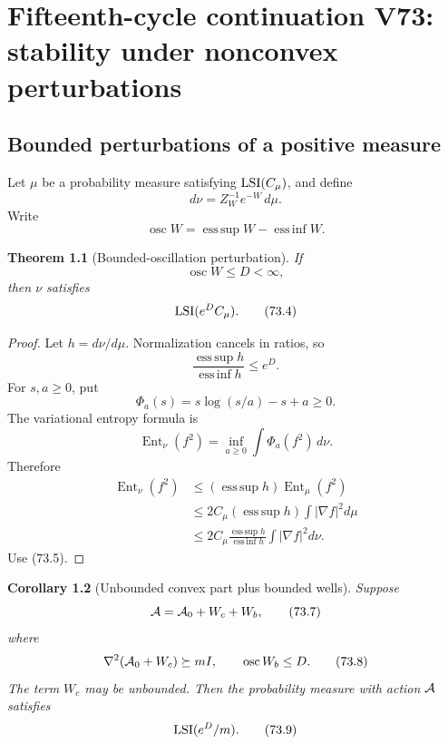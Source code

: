 \documentclass[11pt]{article}
\newtheorem{theorem}{Theorem}[section]
\newtheorem{corollary}[theorem]{Corollary}
\theoremstyle{remark}
\begin{document}
\chapter{Fifteenth-cycle continuation V73: stability under nonconvex perturbations}
\label{sec:v15v73}

\section{Bounded perturbations of a positive measure}

Let \(\mu\) be a probability measure satisfying
\({\rm LSI}(C_\mu)\), and define
\[
 d\nu=Z_W^{-1}e^{-W}\,d\mu.                           \tag{73.1}
\]
Write
\[
 \operatorname{osc}W=\operatorname*{ess\,sup}W
 -\operatorname*{ess\,inf}W.                         \tag{73.2}
\]

\begin{theorem}[Bounded-oscillation perturbation]
\label{thm:v15v73-holley}
If
\[
 \operatorname{osc}W\leq D<\infty,                    \tag{73.3}
\]
then \(\nu\) satisfies
\[
 {\rm LSI}(e^DC_\mu).                                 \tag{73.4}
\]
\end{theorem}

\begin{proof}
Let \(h=d\nu/d\mu\).  Normalization cancels in ratios, so
\[
 \frac{\operatorname*{ess\,sup}h}
 {\operatorname*{ess\,inf}h}\leq e^D.                 \tag{73.5}
\]
For \(s,a\geq0\), put
\[
 \Phi_a(s)=s\log(s/a)-s+a\geq0.
\]
The variational entropy formula is
\[
 \operatorname{Ent}_\nu(f^2)
 =
 \inf_{a\geq0}\int\Phi_a(f^2)\,d\nu.                  \tag{73.6}
\]
Therefore
\[
\begin{split}
 \operatorname{Ent}_\nu(f^2)
 &\leq
 (\operatorname*{ess\,sup}h)
 \operatorname{Ent}_\mu(f^2)\\
 &\leq
 2C_\mu(\operatorname*{ess\,sup}h)
 \int|\nabla f|^2d\mu\\
 &\leq
 2C_\mu
 \frac{\operatorname*{ess\,sup}h}
 {\operatorname*{ess\,inf}h}
 \int|\nabla f|^2d\nu.
\end{split}
\]
Use (73.5).
\end{proof}

\begin{corollary}[Unbounded convex part plus bounded wells]
\label{cor:v15v73-convex-bounded}
Suppose
\[
 {\cal A}={\cal A}_0+W_c+W_b,                         \tag{73.7}
\]
where
\[
 \nabla^2({\cal A}_0+W_c)\succeq mI,\qquad
 \operatorname{osc}W_b\leq D.                         \tag{73.8}
\]
The term \(W_c\) may be unbounded.  Then the probability measure
with action \({\cal A}\) satisfies
\[
 {\rm LSI}(e^D/m).                                    \tag{73.9}
\]
\end{corollary}
\end{document}
